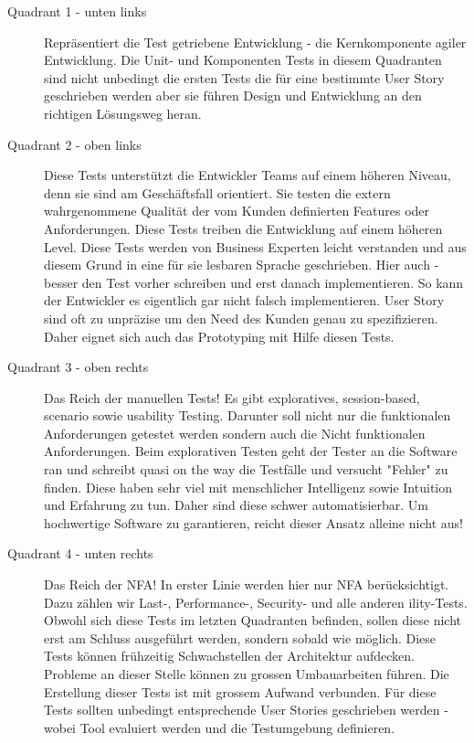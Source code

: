 \begin{description}
	\item[Quadrant 1 - unten links] Repräsentiert die Test getriebene Entwicklung - die Kernkomponente agiler Entwicklung. Die Unit- und Komponenten Tests in diesem Quadranten sind nicht unbedingt die ersten Tests die für eine bestimmte User Story geschrieben werden aber sie führen Design und Entwicklung an den richtigen Lösungsweg heran.
	
	\item[Quadrant 2 - oben links] Diese Tests unterstützt die Entwickler Teams auf einem höheren Niveau, denn sie sind am Geschäftsfall orientiert. Sie testen die extern wahrgenommene Qualität der vom Kunden definierten Features oder Anforderungen. Diese Tests treiben die Entwicklung auf einem höheren Level. Diese Tests werden von Business Experten leicht verstanden und aus diesem Grund in eine für sie lesbaren Sprache geschrieben. Hier auch - besser den Test vorher schreiben und erst danach implementieren. So kann der Entwickler es eigentlich gar nicht falsch implementieren. User Story sind oft zu unpräzise um den Need des Kunden genau zu spezifizieren. Daher eignet sich auch das Prototyping mit Hilfe diesen Tests.
	
	\item[Quadrant 3 - oben rechts] Das Reich der manuellen Tests! Es gibt exploratives, session-based, scenario sowie usability Testing. Darunter soll nicht nur die funktionalen Anforderungen getestet werden sondern auch die Nicht funktionalen Anforderungen. Beim explorativen Testen geht der Tester an die Software ran und schreibt quasi on the way die Testfälle und versucht "Fehler" zu finden. Diese haben sehr viel mit menschlicher Intelligenz sowie Intuition und Erfahrung zu tun. Daher sind diese schwer automatisierbar. Um hochwertige Software zu garantieren, reicht dieser Ansatz alleine nicht aus!
	
	\item[Quadrant 4 - unten rechts] Das Reich der NFA! In erster Linie werden hier nur NFA berücksichtigt. Dazu zählen wir Last-, Performance-, Security- und alle anderen ility-Tests. Obwohl sich diese Tests im letzten Quadranten befinden, sollen diese nicht erst am Schluss ausgeführt werden, sondern sobald wie möglich. Diese Tests können frühzeitig Schwachstellen der Architektur aufdecken. Probleme an dieser Stelle können zu grossen Umbauarbeiten führen. Die Erstellung dieser Tests ist mit grossem Aufwand verbunden. Für diese Tests sollten unbedingt entsprechende User Stories geschrieben werden - wobei Tool evaluiert werden und die Testumgebung definieren.
	

\end{description}
